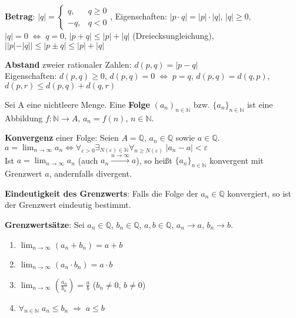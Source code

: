 \textbf{Betrag}:
$|q| = \begin{cases} q, & q \ge 0 \\ -q, & q < 0 \end{cases}$, \quad
Eigenschaften: $|p \cdot q| = |p| \cdot |q|$, \quad $|q| \ge 0$, \quad
$|q| = 0 \;\Leftrightarrow\; q = 0$,
$|p + q| \le |p| + |q|$ (Dreiecksungleichung), \quad
$||p| - |q|| \le |p \pm q| \le |p| + |q|$

\textbf{Abstand} zweier rationaler Zahlen:
$d(p, q) = |p - q|$ \\
Eigenschaften:
$d(p, q) \ge 0$, \;\;
$d(p, q) = 0 \;\Leftrightarrow\; p = q$, \;\;
$d(p, q) = d(q, p)$, \;\;
$d(p, r) \le d(p, q) + d(q, r)$

\linie

Sei A eine nichtleere Menge. Eine \textbf{Folge} $(a_n)_{n \in \mathbb{N}}$
bzw. $\{a_n\}_{n \in \mathbb{N}}$ ist eine Abbildung
$f: \mathbb{N} \rightarrow A$, $a_n = f(n)$, $n \in \mathbb{N}$.

\textbf{Konvergenz} einer Folge: Seien $A = \mathbb{Q}$, $a_n \in \mathbb{Q}$
sowie $a \in \mathbb{Q}$. \\
$a = \lim_{n \to \infty} a_n \Leftrightarrow
\forall_{\varepsilon > 0} \exists_{N(\varepsilon) \in \mathbb{N}}
\forall_{n \ge N(\varepsilon)}\; |a_n - a| < \varepsilon$ \\
Ist $a = \lim_{n \to \infty} a_n$ (auch $a_n \xrightarrow{n \to \infty} a$),
so heißt $\{a_n\}_{n \in \mathbb{N}}$ konvergent mit Grenzwert $a$, andernfalls
divergent.

\textbf{Eindeutigkeit des Grenzwerts}: Falls die Folge der $a_n \in \mathbb{Q}$
konvergiert, so ist der Grenzwert eindeutig bestimmt.

\textbf{Grenzwertsätze}: Sei $a_n \in \mathbb{Q}$, $b_n \in \mathbb{Q}$,
$a, b \in \mathbb{Q}$, $a_n \to a$, $b_n \to b$.

\begin{enumerate}
    \item $\lim_{n \to \infty} (a_n + b_n) = a + b$

    \item $\lim_{n \to \infty} (a_n \cdot b_n) = a \cdot b$

    \item $\lim_{n \to \infty} (\frac{a_n}{b_n}) = \frac{a}{b}$ \quad
    ($b_n \not= 0$, $b \not= 0$)

    \item $\forall_{n \in \mathbb{N}}\; a_n \le b_n \;\Rightarrow\; a \le b$
\end{enumerate}

